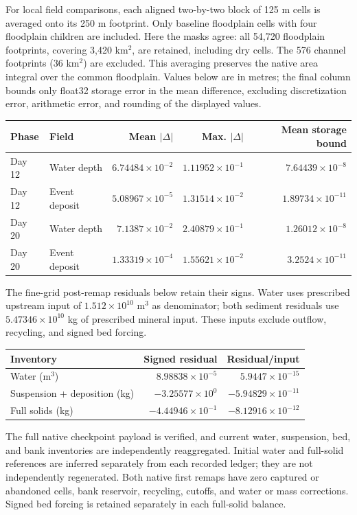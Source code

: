 For local field comparisons, each aligned two-by-two block of 125 m
cells is averaged onto its 250 m footprint. Only baseline floodplain
cells with four floodplain children are included. Here the masks agree:
all 54,720 floodplain footprints, covering 3,420 km$^2$, are retained,
including dry cells. The 576 channel footprints (36 km$^2$) are excluded.
This averaging preserves the native area integral over the common
floodplain. Values below are in metres; the final column bounds only
float32 storage error in the mean difference, excluding discretization
error, arithmetic error, and rounding of the displayed values.

\begin{center}\small\setlength{\tabcolsep}{4pt}
\begin{tabular}{llrrr}
\toprule
Phase & Field & Mean $|\Delta|$ & Max. $|\Delta|$ & Mean storage bound \\
\midrule
Day 12 & Water depth & $6.74484\times10^{-2}$ & $1.11952\times10^{-1}$ & $7.64439\times10^{-8}$ \\
Day 12 & Event deposit & $5.08967\times10^{-5}$ & $1.31514\times10^{-2}$ & $1.89734\times10^{-11}$ \\
Day 20 & Water depth & $7.1387\times10^{-2}$ & $2.40879\times10^{-1}$ & $1.26012\times10^{-8}$ \\
Day 20 & Event deposit & $1.33319\times10^{-4}$ & $1.55621\times10^{-2}$ & $3.2524\times10^{-11}$ \\
\bottomrule\end{tabular}\end{center}
The fine-grid post-remap residuals below retain their signs. Water
uses prescribed upstream input of $1.512\times10^{10}$ m$^3$ as denominator; both
sediment residuals use $5.47346\times10^{10}$ kg of prescribed mineral input.
These inputs exclude outflow, recycling, and signed bed forcing.

\begin{center}\small
\begin{tabular}{lrr}
\toprule
Inventory & Signed residual & Residual/input \\
\midrule
Water (m$^3$) & $8.98838\times10^{-5}$ & $5.9447\times10^{-15}$ \\
Suspension + deposition (kg) & $-3.25577\times10^{0}$ & $-5.94829\times10^{-11}$ \\
Full solids (kg) & $-4.44946\times10^{-1}$ & $-8.12916\times10^{-12}$ \\
\bottomrule\end{tabular}\end{center}
The full native checkpoint payload is verified, and current water,
suspension, bed, and bank inventories are independently reaggregated.
Initial water and full-solid references are inferred separately from
each recorded ledger; they are not independently regenerated.
Both native first remaps have zero captured or abandoned cells, bank
reservoir, recycling, cutoffs, and water or mass corrections. Signed
bed forcing is retained separately in each full-solid balance.

